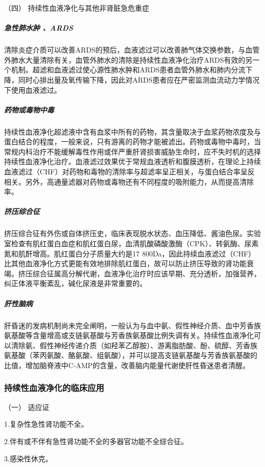 \hypertarget{text00391.htmlux5cux23CHP16-10-2-2-4}{}
（四） 持续性血液净化与其他非肾脏急危重症

\subparagraph{急性肺水肿 、ARDS}

清除炎症介质可以改善ARDS的预后，血液滤过可以改善肺气体交换参数，与血管外肺水大量清除有关，血管外肺水的清除是持续性血液净化治疗ARDS有效的另一个机制。超滤和血液滤过使心源性肺水肿和ARDS患者血管外肺水和肺内分流下降，同时心排出量及氧传输下降，因此对ARDS患者应在严密监测血流动力学情况下使用血液滤过。

\subparagraph{药物或毒物中毒}

持续性血液净化超滤液中含有血浆中所有的药物，其含量取决于血浆药物浓度及与蛋白结合的程度，一般来说，只有游离的药物才能被滤出。药物或毒物中毒时，当常规内科治疗不能缓解毒性作用或伴严重肝肾损害威胁生命时，应不失时机的选择持续性血液净化治疗。血液滤过效果优于常规血液透析和腹膜透析，在理论上持续血液滤过（CHF）对药物和毒物的清除率与超滤率呈正相关，与蛋白结合率呈反相关。另外，高通量滤器对药物或毒物还有不同程度的吸附能力，从而提高清除率。

\subparagraph{挤压综合征}

挤压综合征有外伤或自体挤压史，临床表现脱水状态、血压降低、酱油色尿。实验室检查有肌红蛋白血症和肌红蛋白尿，血清肌酸磷酸激酶（CPK）、转氨酶、尿素氮和肌酐增高。肌红蛋白分子质量大约是17
800Da，因此持续血液滤过（CHF）比其他血液净化方式更能有效地排除肌红蛋白，故可以防止挤压导致的肾功能衰竭。挤压综合征属高分解代谢，血液净化治疗时应该早期、充分透析，加强营养，纠正体液平衡紊乱，碱化尿液是非常重要的。

\subparagraph{肝性脑病}

肝昏迷的发病机制尚未完全阐明，一般认为与血中氨、假性神经介质、血中芳香族氨基酸等含量增高或支链氨基酸与芳香族氨基酸比例失调有关。持续性血液净化可以清除氨、假性神经传递介质（如羟苯乙醇胺）、游离脂肪酸、酚、硫醇、芳香族氨基酸（苯丙氨酸、酪氨酸、组氨酸），并可以提高支链氨基酸与芳香族氨基酸的比值，增加脑脊液中C-AMP的含量，改善脑内能量代谢使肝性昏迷患者清醒。

\subsubsection{持续性血液净化的临床应用}

\hypertarget{text00391.htmlux5cux23CHP16-10-2-3-1}{}
（一） 适应证

1.复杂性急性肾功能不全。

2.伴有或不伴有急性肾功能不全的多器官功能不全综合征。

3.感染性休克。

